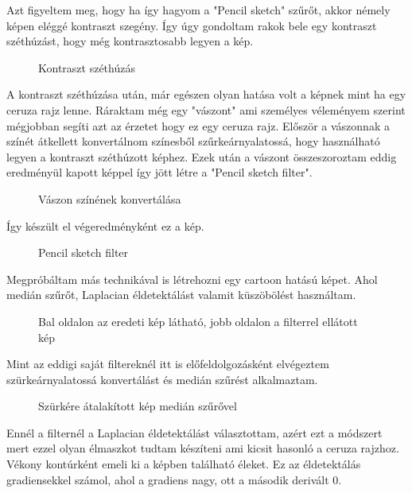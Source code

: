 Azt figyeltem meg, hogy ha így hagyom a "Pencil sketch" szűrőt, akkor némely képen eléggé kontraszt szegény. Így úgy gondoltam rakok bele egy kontraszt széthúzást, hogy még kontrasztosabb legyen a kép.
\begin{figure}[ht]
\centering
{}
\caption{Kontraszt széthúzás } 
\label{fig: pencil5}
\end{figure}
A kontraszt széthúzása után, már egészen olyan hatása volt a képnek mint ha egy ceruza rajz lenne. Ráraktam még egy "vászont" ami személyes véleményem szerint mégjobban segíti azt az érzetet hogy ez egy ceruza rajz. Először a vászonnak a színét átkellett konvertálnom  színesből szűrkeárnyalatossá, hogy használható legyen a kontraszt széthúzott képhez. Ezek után a vászont összeszoroztam eddig eredményül kapott képpel így jött létre a "Pencil sketch filter".
\begin{figure}[ht] 
\centering
{}
\caption{Vászon színének konvertálása } 
\label{fig: pencil6}
\end{figure}
Így készült el végeredményként ez a kép.
\begin{figure}[ht]
\centering
{}
\caption{Pencil sketch filter } 
\label{fig: pencil7}
\end{figure}
Megpróbáltam más technikával is létrehozni egy cartoon hatású képet. Ahol medián szűrőt, Laplacian éldetektálást valamit küszöbölést használtam.
\begin{figure}[ht]
\centering
{}
\caption{Bal oldalon az eredeti kép látható, jobb oldalon a filterrel ellátott kép } 
\label{fig: 2_cartoon1}
\end{figure}
Mint az eddigi saját filtereknél itt is előfeldolgozásként elvégeztem szürkeárnyalatossá konvertálást és medián szűrést alkalmaztam. 
\begin{figure}[ht]
\centering
{}
\caption{Szürkére átalakított kép medián szűrővel  } 
\label{fig:  2_cartoon2}
\end{figure}
Ennél a filternél a Laplacian éldetektálást választottam, azért ezt a módszert mert ezzel olyan élmaszkot tudtam készíteni ami kicsit hasonló a ceruza rajzhoz. Vékony kontúrként emeli ki a képben található éleket. Ez az éldetektálás gradiensekkel számol, ahol a gradiens nagy, ott a második derivált 0.
